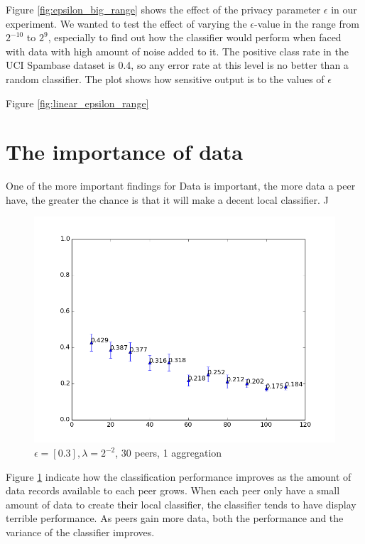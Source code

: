 Figure \ref{fig:epsilon_big_range} shows the effect of the privacy parameter $\epsilon$ in our experiment. We wanted to test the effect of varying the $\epsilon$-value in the range from $2^{-10}$ to $2^9$, especially to find out how the classifier would perform when faced with data with high amount of noise added to it. The positive class rate in the UCI Spambase dataset is 0.4, so any error rate at this level is no better than a random classifier. The plot shows how sensitive output is to the values of $\epsilon$

Figure \ref{fig:linear_epsilon_range} 

\section{The importance of data}
One of the more important findings for 
Data is important, the more data a peer have, the greater the chance is that it will make a decent local classifier. J

\begin{figure}[H]
	\centering
	\includegraphics[width=\textwidth]{fig/eps0.3,budg=eps,peers30,groups5,reg2e-2,dataLim10-110-pubAll-datalimitTEST10-110}
	\caption{$\epsilon = [0.3], \lambda = 2^{-2}$, 30 peers, 1 aggregation}
	\label{fig:data_limit_test}
\end{figure}

Figure \ref{fig:data_limit_test} indicate how the classification performance improves as the amount of data records available to each peer grows. When each peer only have a small amount of data to create their local classifier, the classifier tends to have display terrible performance. As peers gain more data, both the performance and the variance of the classifier improves.     

